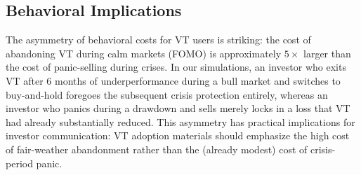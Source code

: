\subsection{Behavioral Implications}

The asymmetry of behavioral costs for VT users is striking: the cost of abandoning VT during calm markets (FOMO) is approximately $5\times$ larger than the cost of panic-selling during crises. In our simulations, an investor who exits VT after 6 months of underperformance during a bull market and switches to buy-and-hold foregoes the subsequent crisis protection entirely, whereas an investor who panics during a drawdown and sells merely locks in a loss that VT had already substantially reduced. This asymmetry has practical implications for investor communication: VT adoption materials should emphasize the high cost of fair-weather abandonment rather than the (already modest) cost of crisis-period panic.
